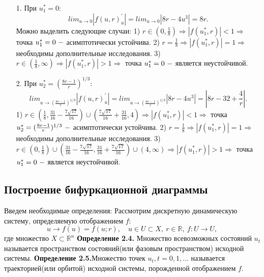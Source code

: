 \documentclass[11pt]{article}
\begin{document}
	\begin{itemize}
		\item [1.] {При $u^*_1 = 0$:}
		\[ lim_{u \to 0}|f(u,r)^{'}_u| = lim_{u \to 0}| 8r - 4u^3| = 8r.\]
		{Можно выделить следующие случаи:}
		\newline
		{1) $r \in (0, \frac{1}{8}) \Rightarrow |f(u^*_1, r)| < 1 \Rightarrow$ точка $u^*_1 = 0\ \--$  асимптотически устойчива.}
		\newline
		{2) $r = \frac{1}{8} \Rightarrow |f(u^*_1, r)| = 1 \Rightarrow $ необходимы дополнительные исследования.}
		\newline
		{3) $r \in (\frac{1}{8}, \infty) \Rightarrow |f(u^*_1, r)| > 1 \Rightarrow $ точка $u^*_1 = 0\ \--$ является неустойчивой.}
		\item [2.] {При $u^*_2 = (\frac{8r - 1}{r})^{1/3}$:}
		\[ lim_{u \to (\frac{8r - 1}{r})^{1/3}}|f(u,r)^{'}_u| = lim_{u \to (\frac{8r - 1}{r})^{1/3}}| 8r - 4u^3| = |8r - 32 + \frac{4}{r}|.\]
			\newline
		{1) $r \in (\frac{1}{8},\frac{31}{16} - \frac{7 \sqrt{17}}{16}) \cup (\frac{7\sqrt{17}}{16} + \frac{31}{16},4 )\Rightarrow |f(u^*_1, r)| < 1 \Rightarrow$ точка $u^*_2 = (\frac{8r - 1}{r})^{1/3}\ \--$  асимптотически устойчива.}
		\newline
		{2) $r = \frac{1}{8} \Rightarrow |f(u^*_1, r)| = 1 \Rightarrow $ необходимы дополнительные исследования.}
		\newline
		{3) $r \in (0,\frac{1}{8}) \cup (\frac{31}{16} - \frac{7\sqrt{17}}{16},\frac{31}{16} + \frac{7\sqrt{17}}{16}) \cup (4,\infty) \Rightarrow |f(u^*_1, r)| > 1 \Rightarrow $ точка $u^*_1 = 0\ \--$ является неустойчивой.}
		
	\end{itemize}
	{\subsection{Построение бифуркационной диаграммы}}
	{Введем необходимые определения:}
	\newline
	{Рассмотрим дискретную динамическую систему, определяемую отображением $f$:}
	\[u \rightarrow f(u)=f(u;r), \quad u \in U \subset X, \ r \in \mathds{R}, \ f: U \rightarrow U, \]
	{где множество $X \subset \mathds{R}^n$}
	\newline
	{\textbf{Определение 2.4.} Множество всевозможных состояний $u_t$ называется пространством состояний(или фазовым пространством) исходной системы.}
	\newline
	{\textbf{Определение 2.5.}Множество точек $u_t, t = 0,1,...$ называется траекторией(или орбитой) исходной системы, порожденной отображением $f$.}
\end{document}
